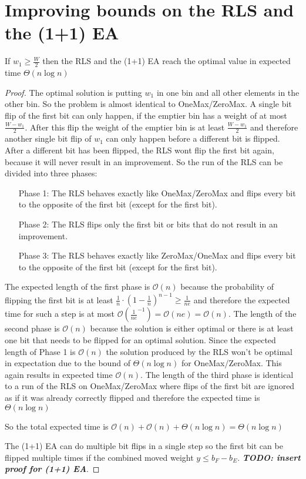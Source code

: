 \section{Improving bounds on the RLS and the (1+1) EA}
\begin{lemma}\label{OneMaxResult}
    If $w_1 \ge \frac W 2$  then the RLS and the (1+1) EA reach the optimal value in expected time $\Theta(n\log{}n)$
\end{lemma}
\begin{proof}
    The optimal solution is putting $w_1$ in one bin and all other elements in the other bin. So the problem is almost identical to OneMax/ZeroMax. A single bit flip of the first bit can only happen, if the emptier bin has a weight of at most $\frac {W-w_1}{2}$. After this flip the weight of the emptier bin is at least $\frac {W-w_1}{2}$ and therefore another single bit flip of $w_1$ can only happen before a different bit is flipped. After a different bit has been flipped, the RLS wont flip the first bit again, because it will never result in an improvement. So the run of the RLS can be divided into three phases:
    \begin{itemize}
        \item[Phase 1:] The RLS behaves exactly like OneMax/ZeroMax and flips every bit to the opposite of the first bit (except for the first bit).
        \item[Phase 2:] The RLS flips only the first bit or bits that do not result in an improvement.
        \item[Phase 3:] The RLS behaves exactly like ZeroMax/OneMax and flips every bit to the opposite of the first bit (except for the first bit).
    \end{itemize}

    The expected length of the first phase is $\mathcal{O}(n)$ because the probability of flipping the first bit is at least ${\frac{1}{n}} \cdot {(1 - \frac{1}{n})}^{n-1} \ge \frac{1}{ne}$ and therefore the expected time for such a step is at most $\mathcal{O}(\frac{1}{ne}^{-1}) = \mathcal{O}(ne) = \mathcal{O}(n)$.\newline
    The length of the second phase is $\mathcal{O}(n)$ because the solution is either optimal or there is at least one bit that needs to be flipped for an optimal solution. Since the expected length of Phase 1 is $\mathcal{O}(n)$ the solution produced by the RLS won't be optimal in expectation due to the bound of $\Theta(n\log{}n)$ for OneMax/ZeroMax. This again results in expected time $\mathcal{O}(n)$.\newline
    The length of the third phase is identical to a run of the RLS on OneMax/ZeroMax where flips of the first bit are ignored as if it was already correctly flipped and therefore the expected time is $\Theta(n\log{}n)$

    So the total expected time is $\mathcal{O}(n) + \mathcal{O}(n) + \Theta(n\log{}n) = \Theta(n\log{}n)$

    The (1+1) EA can do multiple bit flips in a single step so the first bit can be flipped multiple times if the combined moved weight \(y \le b_F-b_E\). \textbf{\textit{TODO: insert proof for (1+1) EA}}.
\end{proof}

